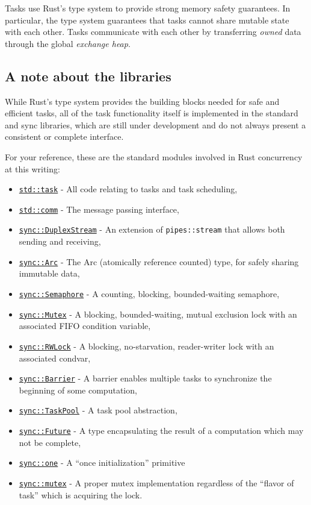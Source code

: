 \documentclass[]{article}
\begin{document}
Tasks use Rust's type system to provide strong memory safety guarantees.
In particular, the type system guarantees that tasks cannot share
mutable state with each other. Tasks communicate with each other by
transferring \emph{owned} data through the global \emph{exchange heap}.

\subsection{A note about the
libraries}\label{a-note-about-the-libraries}

While Rust's type system provides the building blocks needed for safe
and efficient tasks, all of the task functionality itself is implemented
in the standard and sync libraries, which are still under development
and do not always present a consistent or complete interface.

For your reference, these are the standard modules involved in Rust
concurrency at this writing:

\begin{itemize}
\itemsep1pt\parskip0pt
\item
  \href{std/task/index.html}{\texttt{std::task}} - All code relating to
  tasks and task scheduling,
\item
  \href{std/comm/index.html}{\texttt{std::comm}} - The message passing
  interface,
\item
  \href{sync/struct.DuplexStream.html}{\texttt{sync::DuplexStream}} - An
  extension of \texttt{pipes::stream} that allows both sending and
  receiving,
\item
  \href{sync/struct.Arc.html}{\texttt{sync::Arc}} - The Arc (atomically
  reference counted) type, for safely sharing immutable data,
\item
  \href{sync/raw/struct.Semaphore.html}{\texttt{sync::Semaphore}} - A
  counting, blocking, bounded-waiting semaphore,
\item
  \href{sync/mutex/index.html}{\texttt{sync::Mutex}} - A blocking,
  bounded-waiting, mutual exclusion lock with an associated FIFO
  condition variable,
\item
  \href{sync/struct.RWLock.html}{\texttt{sync::RWLock}} - A blocking,
  no-starvation, reader-writer lock with an associated condvar,
\item
  \href{sync/struct.Barrier.html}{\texttt{sync::Barrier}} - A barrier
  enables multiple tasks to synchronize the beginning of some
  computation,
\item
  \href{sync/struct.TaskPool.html}{\texttt{sync::TaskPool}} - A task
  pool abstraction,
\item
  \href{sync/struct.Future.html}{\texttt{sync::Future}} - A type
  encapsulating the result of a computation which may not be complete,
\item
  \href{sync/one/index.html}{\texttt{sync::one}} - A ``once
  initialization'' primitive
\item
  \href{sync/mutex/index.html}{\texttt{sync::mutex}} - A proper mutex
  implementation regardless of the ``flavor of task'' which is acquiring
  the lock.
\end{itemize}
\end{document}
